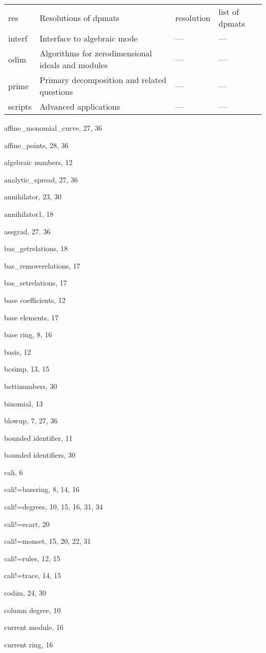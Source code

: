 \begin{tabular}{|p{1.5cm}||p{5.5cm}|p{2cm}|p{4cm}|}
res & Resolutions of dpmats & resolution & list of dpmats \\

interf & Interface to algebraic mode & --- & ---\\

odim & Algorithms for zerodimensional ideals and modules & --- & ---\\ 

prime & Primary decomposition and related questions & --- & ---\\

scripts & Advanced applications  & --- & ---\\
\hline
\end{tabular}
\vfill
\pagebreak

\begin{theindex}

  \item affine\_monomial\_curve, 27, 36
  \item affine\_points, 28, 36
  \item algebraic numbers, 12
  \item analytic\_spread, 27, 36
  \item annihilator, 23, 30
  \item annihilator1, 18
  \item assgrad, 27, 36

  \indexspace

  \item bas\_getrelations, 18
  \item bas\_removerelations, 17
  \item bas\_setrelations, 17
  \item base coefficients, 12
  \item base elements, 17
  \item base ring, 8, 16
  \item basis, 12
  \item bcsimp, 13, 15
  \item bettinumbers, 30
  \item binomial, 13
  \item blowup, 7, 27, 36
  \item bounded identifier, 11
  \item bounded identifiers, 30

  \indexspace

  \item cali, 6
  \item cali!=basering, 8, 14, 16
  \item cali!=degrees, 10, 15, 16, 31, 34
  \item cali!=ecart, 20
  \item cali!=monset, 15, 20, 22, 31
  \item cali!=rules, 12, 15
  \item cali!=trace, 14, 15
  \item codim, 24, 30
  \item column degree, 10
  \item current module, 16
  \item current ring, 16


\end{theindex}
